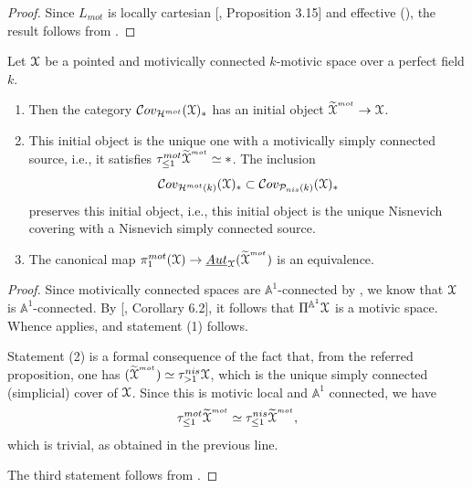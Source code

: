 \begin{proof}
    Since $L_{mot}$ is locally cartesian [\cite{hoyois2017six}, Proposition 3.15] and effective (), the result follows from .
\end{proof}
\begin{thm}\label{motivically simply connected covering space}
Let $\EuScript{X}$ be a pointed and motivically connected $k$-motivic space over a perfect field $k$.
\begin{enumerate}
    \item Then the category $\mathcal{C}ov_{\mathcal{H}^{mot}}(\EuScript{X})_*$ has an initial object ${\widetilde{{\EuScript{X}}}}^{^{mot}}\to \EuScript{X}$.
    \item This initial object is the unique one with a motivically simply connected source, i.e., it satisfies $\tau_{\leq 1}^{mot}{\widetilde{{\EuScript{X}}}}^{^{mot}}\simeq *$. The inclusion  $$\mathcal{C}ov_{\mathcal{H}^{mot}(k)}(\EuScript{X})_*\subset \mathcal{C}ov_{\mathcal{P}_{nis}(k)}(\EuScript{X})_*$$ preserves this initial object, i.e., this initial object is the unique Nisnevich covering with a Nisnevich simply connected source.
    \item The canonical map $ \pi_1^{mot}(\EuScript{X})\to \underline{Aut}_{\EuScript{X}}(\widetilde{{\EuScript{X}}}^{^{mot}})$ is an equivalence.
\end{enumerate}
\end{thm}
\begin{proof}
    Since motivically connected spaces are $\mathbb{A}^1$-connected by , we know that $\EuScript{X}$ is $\mathbb{A}^1$-connected. By [\cite{morel2012a1}, Corollary 6.2], it follows that $\Pi^{\mathbb{A}^1}\EuScript{X}$ is a motivic space. Whence  applies, and statement (1) follows. 
    
Statement (2) is a formal consequence of the fact that, from the referred proposition, one has $(\widetilde{{\EuScript{X}}}^{^{mot}})\simeq \tau_{>1}^{nis}\EuScript{X}$, which is the unique simply connected (simplicial) cover of $\EuScript{X}$. Since this is motivic local and $\mathbb{A}^1$ connected, we have $$\tau_{\leq 1}^{mot}{\widetilde{{\EuScript{X}}}}^{^{mot}}\simeq \tau_{\leq 1}^{nis}{\widetilde{{\EuScript{X}}}}^{^{mot}},$$ which is trivial, as obtained in the previous line. 
    
The third statement follows from .
\end{proof}


